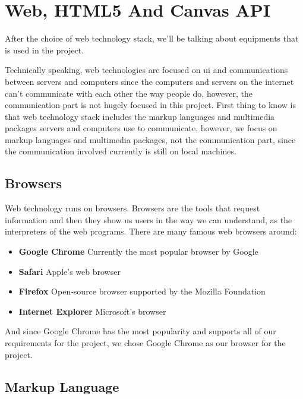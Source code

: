 
\section{Web, HTML5 And Canvas API}

After the choice of web technology stack, we'll be talking about equipments that is used in the project.

Technically speaking, web technologies are focused on \gls{ui} and communications between servers and computers since the computers and servers on the internet can't communicate with each other the way people do, however, the communication part is not hugely focused in this project. First thing to know is that web technology stack includes the markup languages and multimedia packages servers and computers use to communicate, however, we focus on markup languages and multimedia packages, not the communication part, since the communication involved currently is still on local machines.

\subsection{Browsers}

Web technology runs on browsers. Browsers are the tools that request information and then they show us users in the way we can understand, as the interpreters of the web programs. There are many famous web browsers around:

\begin{itemize}
    \item \textbf{Google Chrome} Currently the most popular browser by Google
    \item \textbf{Safari} Apple's web browser
    \item \textbf{Firefox} Open-source browser supported by the Mozilla Foundation
    \item \textbf{Internet Explorer} Microsoft's browser
\end{itemize}

And since Google Chrome has the most popularity and supports all of our requirements for the project, we chose Google Chrome as our browser for the project.

\subsection{Markup Language}


